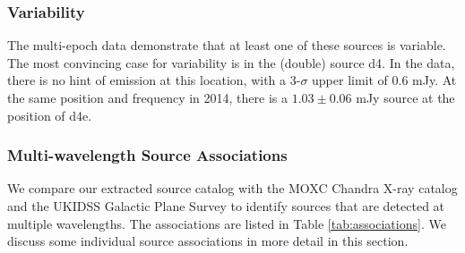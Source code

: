 
\subsubsection{Variability}
\label{sec:variability}
The multi-epoch data demonstrate that at least one of these sources is
variable.  The most convincing case for variability is in the (double) source
d4.  In the \citet{Mehringer1994a} data, there is no
hint of emission at this location, with a 3-$\sigma$ upper limit of 0.6 mJy.
At the same position and frequency in 2014, there is a $1.03 \pm 0.06$ mJy
source at the position of d4e. 


\subsubsection{Multi-wavelength Source Associations}
\label{sec:associations}
We compare our extracted source catalog with the MOXC Chandra X-ray catalog
\citep{Townsley2014a} and the UKIDSS Galactic Plane Survey
\citep[UGPS;][]{Lucas2008a} to identify sources that are detected at multiple
wavelengths.  The associations are listed in Table
\ref{tab:associations}.  We discuss some
individual source associations in more detail in this section.

